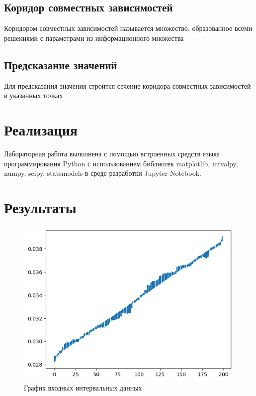 \documentclass[12pt,a4paper]{article}
\begin{document}
\subsection{Коридор совместных зависимостей}
Коридором совместных зависимостей называется множество, образованное всеми решениями с параметрами из информационного множества

\subsection{Предсказание значений}
Для предсказания значения строится сечение коридора совместных зависимостей в указанных точках

\section{Реализация}
Лабораторная работа выполнена с помощью встроенных средств языка программирования Python с использованием библиотек matplotlib, intvalpy, numpy, scipy, statsmodels в среде разработки Jupyter Notebook.

\section{Результаты}

\begin{figure}[H]
    \centering
    \includegraphics[width=14cm]{4_1.png}
    \caption{График входных интервальных данных}
    \label{fig:info}
\end{figure}
\end{document}
